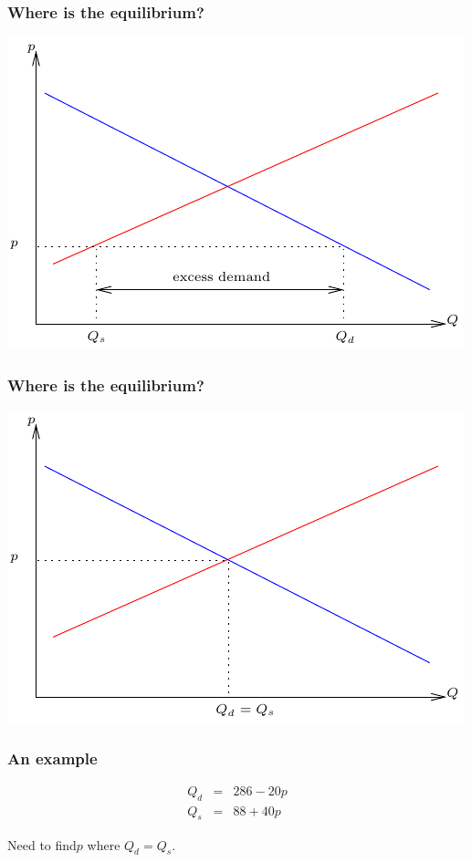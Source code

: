 \documentclass[xcolor=pdftex,dvipsnames]{beamer}
\begin{document}
\begin{frame}
\frametitle{Where is the equilibrium?}
\begin{center}
\includegraphics{pics/Equilibrium01}
\end{center}
\end{frame}

\begin{frame}
\frametitle{Where is the equilibrium?}
\begin{center}
\includegraphics{pics/Equilibrium02}
\end{center}
\end{frame}

\begin{frame}
\frametitle{An example}
\[
\begin{array}{rcl}
Q_d &=& 286-20p\\
Q_s&=&88+40p
\end{array}
\]

Need to find$p$ where $Q_d=Q_s$.\bigskip


\end{frame}
\end{document}
